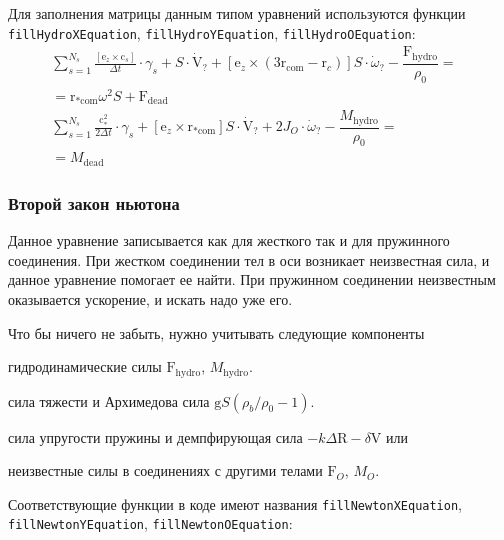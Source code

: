 \documentclass[14pt]{extreport}
\newcommand{\br}[1]{\boldsymbol{\mathrm{#1}}}
\renewcommand{\vec}[1]{\br{#1}}
\newenvironment{packed_itemize}{
\begin{itemize}
  \setlength{\itemsep}{1pt}
  \setlength{\parskip}{0pt}
  \setlength{\parsep}{0pt}
}{\end{itemize}}
\begin{document}
Для заполнения матрицы данным типом уравнений используются функции
\texttt{fillHydroXEquation}, \texttt{fillHydroYEquation}, \texttt{fillHydroOEquation}:
\begin{equation}
\begin{split}
\sum\limits_{s=1}^{N_s} {\frac{[\vec e_z \times \vec c_s]}{\Delta t} \cdot \gamma_s}
+ S \cdot \dot{\vec{V}}_?
+ [\vec e_z \times (3 \vec r_\text{com} - \vec r_c)] S \cdot \dot{\omega}_?
- \dfrac{\vec F_\text{hydro}}{\rho_0} =&\\
= %
\vec r_{*\text{com}} \omega^2 S
+ \vec F_\text{dead}&\\
\sum\limits_{s=1}^{N_s} {\frac{\vec c_*^2}{2\Delta t} \cdot \gamma_s}
+ [\vec e_z \times \vec r_{*\text{com}}] S \cdot \dot{\vec{V}}_?
+ 2 J_O \cdot \dot{\omega}_?
- \dfrac{M_\text{hydro}}{\rho_0} =&\\
= %
M_\text{dead}&
\end{split}
\end{equation}

\subsubsection{Второй закон ньютона}
\label{slau_newton}

Данное уравнение записывается как для жесткого так и для пружинного соединения.
При жестком соединении тел в оси возникает неизвестная сила, и данное уравнение помогает ее найти.
При пружинном соединении неизвестным оказывается ускорение, и искать надо уже его.

Что бы ничего не забыть, нужно учитывать следующие компоненты
\begin{packed_itemize}
\item гидродинамические силы $\vec F_\text{hydro}$, $M_\text{hydro}$.
\item сила тяжести и Архимедова сила $\vec g S(\rho_b/\rho_0 - 1)$.
\item сила упругости пружины и демпфирующая сила $-k \Delta \vec R - \delta \vec V$ или
\item неизвестные силы в соединениях с другими телами $\vec F_O$, $M_O$.
\end{packed_itemize}

Соответствующие функции в коде имеют названия \texttt{fillNewtonXEquation}, \\\texttt{fillNewtonYEquation}, \texttt{fillNewtonOEquation}:
\end{document}
